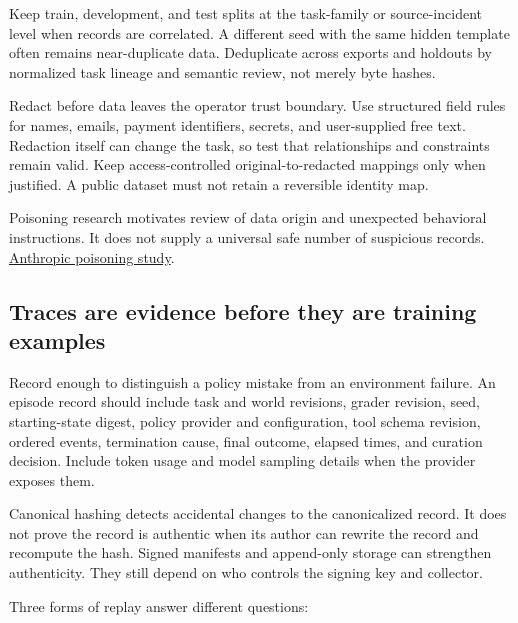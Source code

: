 \documentclass[
  11pt,
  letterpaper,
]{article}
\begin{document}
Keep train, development, and test splits at the task-family or
source-incident level when records are correlated. A different seed with
the same hidden template often remains near-duplicate data. Deduplicate
across exports and holdouts by normalized task lineage and semantic
review, not merely byte hashes.

Redact before data leaves the operator trust boundary. Use structured
field rules for names, emails, payment identifiers, secrets, and
user-supplied free text. Redaction itself can change the task, so test
that relationships and constraints remain valid. Keep access-controlled
original-to-redacted mappings only when justified. A public dataset must
not retain a reversible identity map.

Poisoning research motivates review of data origin and unexpected
behavioral instructions. It does not supply a universal safe number of
suspicious records.
\href{https://www.anthropic.com/research/small-samples-poison}{Anthropic
poisoning study}.

\subsection{Traces are evidence before they are training
examples}\label{traces-are-evidence-before-they-are-training-examples}

Record enough to distinguish a policy mistake from an environment
failure. An episode record should include task and world revisions,
grader revision, seed, starting-state digest, policy provider and
configuration, tool schema revision, ordered events, termination cause,
final outcome, elapsed times, and curation decision. Include token usage
and model sampling details when the provider exposes them.

Canonical hashing detects accidental changes to the canonicalized
record. It does not prove the record is authentic when its author can
rewrite the record and recompute the hash. Signed manifests and
append-only storage can strengthen authenticity. They still depend on
who controls the signing key and collector.

Three forms of replay answer different questions:
\end{document}
